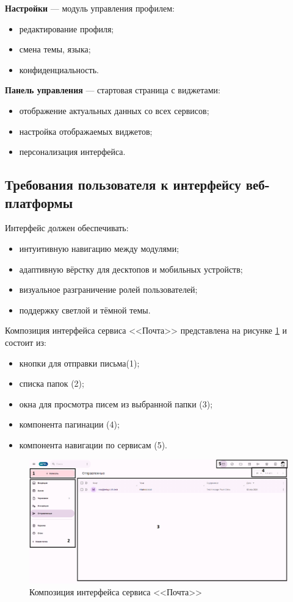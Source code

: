   \textbf{Настройки} — модуль управления профилем:
  \begin{itemize}
    \item редактирование профиля;
    \item смена темы, языка;
    \item конфиденциальность.
  \end{itemize}

  \textbf{Панель управления} — стартовая страница с виджетами:
  \begin{itemize}
    \item отображение актуальных данных со всех сервисов;
    \item настройка отображаемых виджетов;
    \item персонализация интерфейса.
  \end{itemize}

\subsection{Требования пользователя к интерфейсу веб-платформы}

Интерфейс должен обеспечивать:
\begin{itemize}
  \item интуитивную навигацию между модулями;
  \item адаптивную вёрстку для десктопов и мобильных устройств;
  \item визуальное разграничение ролей пользователей;
  \item поддержку светлой и тёмной темы.
\end{itemize}

Композиция интерфейса сервиса <<Почта>> представлена на рисунке \ref{templ:image1} и состоит из:
\begin{itemize}
  \item кнопки для отправки письма(1);
  \item списка папок (2);
  \item окна для просмотра писем из выбранной папки (3);
  \item компонента пагинации (4);
  \item компонента навигации по сервисам (5).
\end{itemize}
\begin{figure}[H]
	\centering
	\includegraphics[width=1\linewidth]{images/почта}
	\caption{Композиция интерфейса сервиса <<Почта>>}
	\label{templ:image1}
\end{figure}

